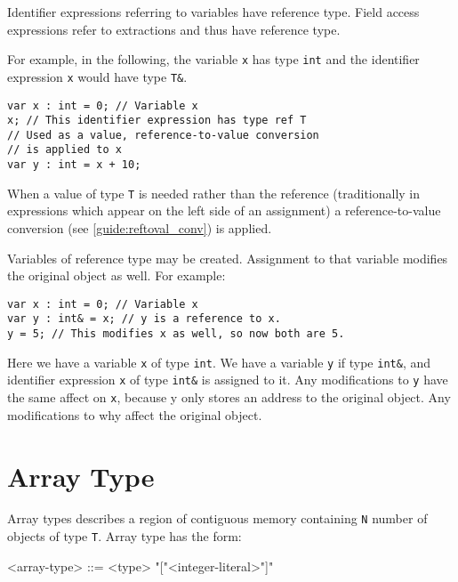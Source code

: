 Identifier expressions referring to variables have reference type. Field access expressions refer to extractions and thus have reference type.

For example, in the following, the variable \texttt{x} has type \texttt{int} and the identifier expression \texttt{x} would have type \texttt{T\&}.

\begin{minip}
\begin{lstlisting}
var x : int = 0; // Variable x
x; // This identifier expression has type ref T
// Used as a value, reference-to-value conversion
// is applied to x
var y : int = x + 10;
\end{lstlisting}
\end{minip}

When a value of type \texttt{T} is needed rather than the reference (traditionally in expressions which appear on the left side of an assignment) a reference-to-value conversion (see \ref{guide:reftoval_conv}) is applied. 

Variables of reference type may be created. Assignment to that variable modifies the original object as well. For example:

\begin{minip}
\begin{lstlisting}
var x : int = 0; // Variable x
var y : int& = x; // y is a reference to x.
y = 5; // This modifies x as well, so now both are 5.
\end{lstlisting}
\end{minip}

Here we have a variable \texttt{x} of type \texttt{int}. We have a variable \texttt{y} if type \texttt{int\&}, and identifier expression \texttt{x} of type \texttt{int\&} is assigned to it. Any modifications to \texttt{y} have the same affect on \texttt{x}, because y only stores an address to the original object. Any modifications to why affect the original object.

\section{Array Type} \label{guide:array_type}

Array types describes a region of contiguous memory containing \texttt{N} number of objects of type \texttt{T}. Array type has the form: 

\begin{minip}
\begin{grammar}
<array-type> ::= <type> "["<integer-literal>"]"
\end{grammar}
\end{minip}

